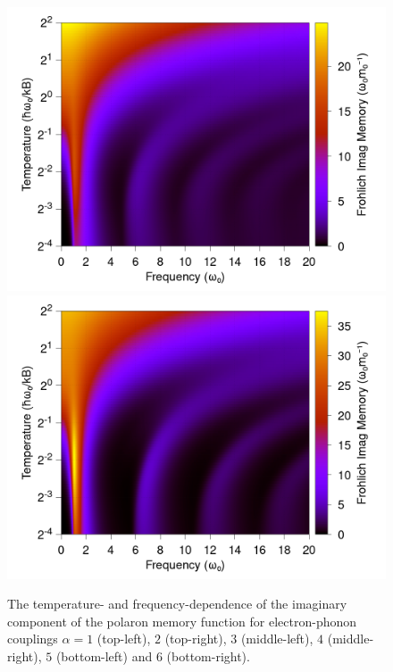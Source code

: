 \begin{figure}[t]
    \includegraphics[width=.49\textwidth]{figures/frohlich-3d-imag-memory-alpha-5-temp-00625to32-freq-0to30-contourf.png}
    \includegraphics[width=.49\textwidth]{figures/frohlich-3d-imag-memory-alpha-6-temp-00625to32-freq-0to30-contourf.png}

    \caption{The temperature- and frequency-dependence of the imaginary component of the polaron memory function for electron-phonon couplings $\alpha = 1$ (top-left), $2$ (top-right), $3$ (middle-left), $4$ (middle-right), $5$ (bottom-left) and $6$ (bottom-right).}
    \label{fig:osakaridge}
\end{figure}
\FloatBarrier  

